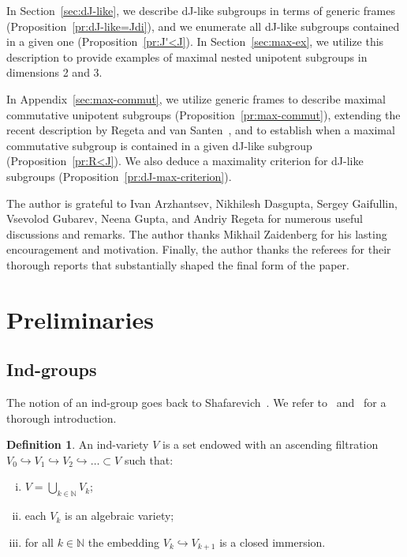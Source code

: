 \documentclass[12pt,a4paper]{amsart}
\theoremstyle{plain}
\theoremstyle{definition}
\newtheorem{definition}[theorem]{Definition}
\theoremstyle{remark}
\def\NN{{\mathbb N}}
\def\embed{\hookrightarrow}
\begin{document}
In Section~\ref{sec:dJ-like}, we describe dJ-like subgroups in terms of generic frames (Proposition~\ref{pr:dJ-like=Jdi}), and we enumerate all dJ-like subgroups contained in a given one (Proposition~\ref{pr:J'<J}).
In Section~\ref{sec:max-ex}, we utilize this description to provide examples of maximal nested unipotent subgroups in dimensions 2 and 3.


In Appendix~\ref{sec:max-commut}, we utilize generic frames to describe maximal commutative unipotent subgroups (Proposition~\ref{pr:max-commut}), extending the recent description by Regeta and van Santen~\cite{RvS}, and to establish when a maximal commutative subgroup is contained in a given dJ-like subgroup (Proposition~\ref{pr:R<J}). We also deduce a maximality criterion for dJ-like subgroups (Proposition~\ref{pr:dJ-max-criterion}).


The author is grateful to Ivan Arzhantsev, Nikhilesh Dasgupta, Sergey Gaifullin, Vsevolod Gubarev, 
Neena Gupta, and Andriy Regeta for numerous useful discussions and remarks.
The author thanks Mikhail Zaidenberg for his lasting encouragement and motivation.
Finally, the author thanks the referees for their thorough reports that substantially shaped the final form of the paper.




\section{Preliminaries}\label{sec:prelim}

\subsection{Ind-groups}\label{sec:ind-groups}

The notion of an ind-group goes back to Shafarevich~\cite{Sh66}. 
We refer to~\cite{FK} and~\cite{KZ24} for a thorough introduction.


\begin{definition}
   An ind-variety $V$ is a set endowed with an ascending filtration
   $V_0 \embed V_1 \embed V_2 \embed \ldots \subset V$ such that:
   \begin{enumerate}[(i)]
   \item $V = \bigcup_{k \in \NN} V_k$;
   \item each $V_k$ is an algebraic variety;
   \item for all $k \in \NN$ the embedding $V_k \embed V_{k+1}$ is a closed immersion.
   \end{enumerate}
\end{definition}
   
\end{document}
